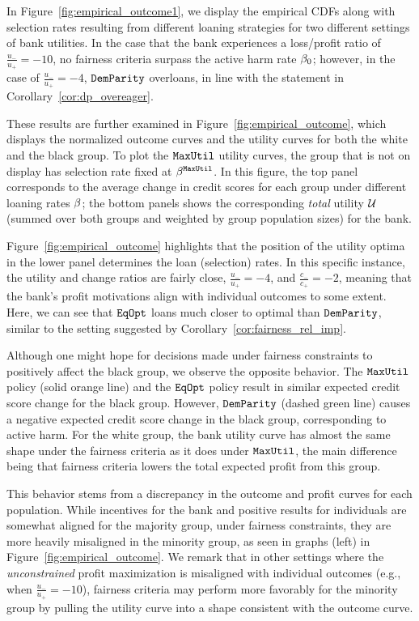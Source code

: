 In Figure~\ref{fig:empirical_outcome1}, we display the empirical CDFs along with selection rates resulting from different loaning strategies for two different settings of bank utilities. In the case that the bank experiences a loss/profit ratio of $\frac{u_-}{u_+} = -10$, no fairness criteria surpass the active harm rate $\beta_0$; however, in the case of $\frac{u_-}{u_+} = -4$, $\mathtt{DemParity}$ overloans, in line with the statement in Corollary~\ref{cor:dp_overeager}.

These results are further examined in Figure~\ref{fig:empirical_outcome}, which displays the normalized outcome curves and the utility curves for both the white and the black group. To plot the $\mathtt{MaxUtil}$ utility curves, the group that is not on display has selection rate fixed at $\beta^{\mathtt{MaxUtil}}$. In this figure, the top panel corresponds to the average change in credit scores for each group under different loaning rates $\beta$; the bottom panels shows the corresponding \emph{total} utility $\mathcal{U}$ (summed over both groups and weighted by group population sizes) for the bank. %

Figure~\ref{fig:empirical_outcome} highlights that the position of the utility optima in the lower panel determines the loan (selection) rates. In this specific instance, the utility and change ratios are fairly close, $\frac{u_-}{u_+} = -4$, and $\frac{c_-}{c_+} = -2$, meaning that the bank's profit motivations align with individual outcomes to some extent. Here, we can see that $\mathtt{EqOpt}$ loans much closer to optimal than $\mathtt{DemParity}$, similar to the setting suggested by Corollary~\ref{cor:fairness_rel_imp}.

Although one might hope for decisions made under fairness constraints to positively affect the black group, we observe the opposite behavior. The $\mathtt{MaxUtil}$ policy (solid orange line) and the $\mathtt{EqOpt}$ policy result in similar expected credit score change for the black group. However, $\mathtt{DemParity}$ (dashed green line) causes a negative expected credit score change in the black group, corresponding to active harm. For the white group, the bank utility curve has almost the same shape under the fairness criteria as it does under $\mathtt{MaxUtil}$, the main difference being that fairness criteria lowers the total expected profit from this group. 


This behavior stems from a discrepancy in the outcome and profit curves for each population. While incentives for the bank and positive results for individuals are somewhat aligned for the majority group, under fairness constraints, they are more heavily misaligned in the minority group, as seen in graphs (left) in Figure~\ref{fig:empirical_outcome}. We remark that in other settings where the \emph{unconstrained} profit maximization is misaligned with individual outcomes (e.g., when $\frac{u_-}{u_+} = -10$), fairness criteria may perform more favorably for the minority group by pulling the utility curve into a shape consistent with the outcome curve.

